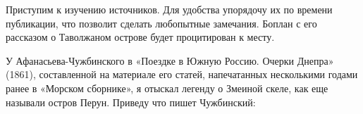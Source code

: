






Приступим к изучению источников. Для удобства упорядочу их по времени публикации, что позволит сделать любопытные замечания. Боплан с его рассказом о Таволжаном острове будет процитирован к месту.

У Афанасьева-Чужбинского в «Поездке в Южную Россию. Очерки Днепра» (1861), составленной на материале его статей, напечатанных несколькими годами ранее в «Морском сборнике», я отыскал легенду о Змеиной скеле\cite[том VII, стр. 116]{afanchujb}, как еще называли остров Перун. Приведу что пишет Чужбинский:

